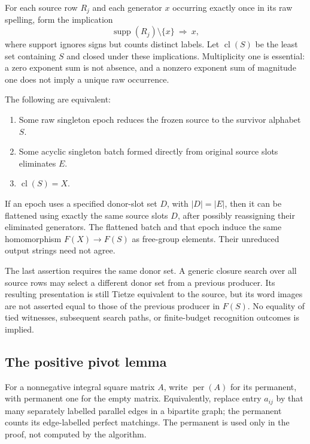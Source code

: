 For each source row $R_j$ and each generator $x$ occurring exactly once in
its raw spelling, form the implication
\[
 \operatorname{supp}(R_j)\setminus\{x\}\ \Longrightarrow\ x,
 \tag{H}\label{eq:raw-horn-rule}
\]
where support ignores signs but counts distinct labels. Let
$\operatorname{cl}(S)$ be the least set containing $S$ and closed under
these implications. Multiplicity one is essential: a zero exponent sum is
not absence, and a nonzero exponent sum of magnitude one does not imply a
unique raw occurrence.

\begin{theorem}
\label{thm:raw-closure-equivalence}
The following are equivalent:
\begin{enumerate}
\item Some raw singleton epoch reduces the frozen source to the survivor
      alphabet $S$.
\item Some acyclic singleton batch formed directly from original source
      slots eliminates $E$.
\item $\operatorname{cl}(S)=X$.
\end{enumerate}
If an epoch uses a specified donor-slot set $D$, with $|D|=|E|$, then it can
be flattened using exactly the same source slots $D$, after possibly
reassigning their eliminated generators. The flattened batch and that
epoch induce the same homomorphism $F(X)\to F(S)$ as free-group elements.
Their unreduced output strings need not agree.
\end{theorem}

The last assertion requires the same donor set. A generic closure search
over all source rows may select a different donor set from a previous
producer. Its resulting presentation is still Tietze equivalent to the
source, but its word images are not asserted equal to those of the previous
producer in $F(S)$. No equality of tied witnesses, subsequent search paths,
or finite-budget recognition outcomes is implied.

\subsection{The positive pivot lemma}

For a nonnegative integral square matrix $A$, write $\operatorname{per}(A)$
for its permanent, with permanent one for the empty matrix. Equivalently,
replace entry $a_{ij}$ by that many separately labelled parallel edges in a
bipartite graph; the permanent counts its edge-labelled perfect matchings.
The permanent is used only in the proof, not computed by the algorithm.

